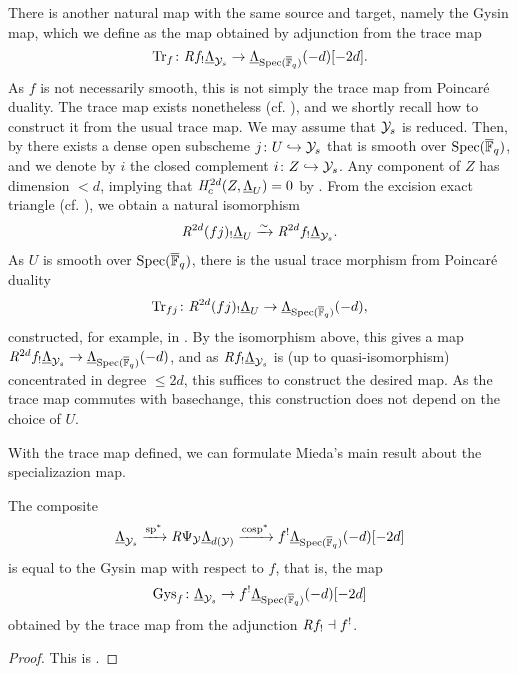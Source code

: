 \documentclass[../main.tex]{subfiles}
\begin{document}
There is another natural map with the same source and target, namely the 
Gysin map, which we define as the map obtained by adjunction from the trace map
\begin{equation*}
  \operatorname{Tr}_f\colon \mathit R f_! \underline \Lambda_{\mathcal{Y}_s} \to \underline
  \Lambda_{\operatorname{Spec}({\overline {\mathbb{F}}_q})}(-d)[-2d].
\end{equation*}
As $f$ is not necessarily smooth, this is not
simply the trace map from Poincar\'e duality. The trace map exists
nonetheless (cf. \cite[XVIII, Théorème 2.9]{SGA4}), and we shortly 
recall how to construct it from the usual trace map. We may assume that $\mathcal{Y}_s$
is reduced. Then, by \cite[\href{https://stacks.math.columbia.edu/tag/056V}{Tag
056V}]{stacks-project} 
there exists a dense open subscheme $j \colon U \hookrightarrow \mathcal{Y}_s$ that is smooth over 
$\operatorname{Spec}({\overline {\mathbb{F}}_q})$, and we denote by $i$ the closed complement 
$i \colon Z \hookrightarrow \mathcal{Y}_s$. Any component of $Z$ has dimension $< d$, implying that
$\mathit H^{2d}_c(Z, \underline \Lambda_U) = 0$ by \cite[Theorem 7.4.5]{LeiFuEtale}.
From the excision exact triangle (cf. \cite[Theorem 7.4.4 (iii)]{LeiFuEtale}),
we obtain a natural isomorphism
\begin{equation*}
  \mathit R^{2d} (fj)_! \underline \Lambda_U \xrightarrow{\sim} \mathit R^{2d} f_! \underline
  \Lambda_{\mathcal{Y}_s}.
\end{equation*}
As $U$ is smooth over $\operatorname{Spec}({\overline {\mathbb{F}}_q})$, there is the usual trace morphism from
Poincar\'e duality
\begin{equation*}
  \operatorname{Tr}_{fj}\colon \mathit R^{2d}(fj)_! \underline \Lambda_U \to \underline
  \Lambda_{\operatorname{Spec}({\overline {\mathbb{F}}_q})}(-d),
\end{equation*}
constructed, for example, in \cite[§8.2]{LeiFuEtale}. By the isomorphism
above, this gives a map $\mathit R^{2d} f_! \underline \Lambda_{\mathcal{Y}_s} \to \underline
\Lambda_{\operatorname{Spec}({\overline {\mathbb{F}}_q})}(-d)$, and as $\mathit R f_! \underline \Lambda_{\mathcal{Y}_s}$ is
(up to quasi-isomorphism) concentrated in degree $\leq 2d$, this suffices to
construct the desired map. As the trace map commutes with basechange, this construction
does not depend on the choice of $U$.

With the trace map defined, we can formulate Mieda's main result about the
specializazion map.
\begin{prop}\label{prop:MiedaFirstStepSpecMap}
  The composite 
  \begin{equation*}
    \underline{\Lambda}_{\mathcal{Y}_s} \xrightarrow{\mathrm{sp}^*} \mathit R \Psi_{\mathcal{Y}} \underline
    \Lambda_{d(\mathcal{Y})} \xrightarrow{\mathrm{cosp}^*} f^! \underline
    \Lambda_{\operatorname{Spec}({\overline {\mathbb{F}}_q})}(-d)[-2d]
  \end{equation*}
  is equal to the Gysin map with respect to $f$, that is, the map
  \begin{equation*}
    \mathrm{Gys}_f \colon \underline \Lambda_{\mathcal{Y}_s} \to f^! \underline
    \Lambda_{\operatorname{Spec}({\overline {\mathbb{F}}_q})}(-d)[-2d]
  \end{equation*}
  obtained by the trace map from the adjunction $\mathit R f_! \dashv f^!$.
  \begin{proof}
    This is \cite[Theorem 2.1]{mieda2016geometric}.
  \end{proof}
\end{prop}
\end{document}
